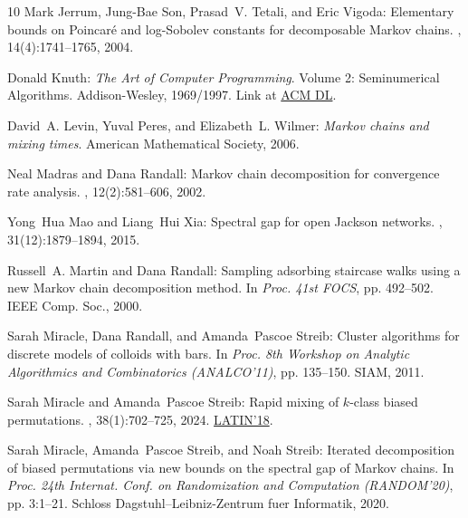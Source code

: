\documentclass[11pt]{article}
\begin{document}
\begin{thebibliography}{10}
{\sc Mark Jerrum, Jung-Bae Son, Prasad~V. Tetali, and Eric Vigoda}: Elementary
  bounds on {P}oincar\'e and log-{S}obolev constants for decomposable {M}arkov
  chains.
, 14(4):1741--1765, 2004.
\newblock [\epfmtdoi{10.1214/105051604000000639}]

{\sc Donald Knuth}: {\em The Art of Computer Programming}.
\newblock Volume 2: Seminumerical Algorithms.
\newblock Addison-Wesley, 1969/1997.
\newblock Link at \href{https://dl.acm.org/doi/10.5555/270146}{ACM DL}.

{\sc David~A. Levin, Yuval Peres, and Elizabeth~L. Wilmer}: {\em {M}arkov
  chains and mixing times}.
\newblock American Mathematical Society, 2006.

{\sc Neal Madras and Dana Randall}: Markov chain decomposition for convergence
  rate analysis.
, 12(2):581--606, 2002.

{\sc Yong~Hua Mao and Liang~Hui Xia}: Spectral gap for open {J}ackson networks.
, 31(12):1879--1894, 2015.
\newblock [\epfmtdoi{10.1007/S10114-015-4138-3}]

{\sc Russell~A. Martin and Dana Randall}: Sampling adsorbing staircase walks
  using a new {M}arkov chain decomposition method.
\newblock In {\em Proc. 41st FOCS}, pp. 492--502. IEEE Comp. Soc., 2000.

{\sc Sarah Miracle, Dana Randall, and Amanda~Pascoe Streib}: Cluster algorithms
  for discrete models of colloids with bars.
\newblock In {\em Proc. 8th Workshop on Analytic Algorithmics and Combinatorics
  (ANALCO'11)}, pp. 135--150. SIAM, 2011.
\newblock [\epfmtdoi{10.1137/1.9781611973013.15}]

{\sc Sarah Miracle and Amanda~Pascoe Streib}: Rapid mixing of $k$-class biased
  permutations.
, 38(1):702--725, 2024.
\newblock \prelim
  \href{https://doi.org/10.1007/978-3-319-77404-6\_59}{LATIN'18}.
\newblock [\epfmtdoi{10.1137/22M148063X}]

{\sc Sarah Miracle, Amanda~Pascoe Streib, and Noah Streib}: Iterated
  decomposition of biased permutations via new bounds on the spectral gap of
  {M}arkov chains.
\newblock In {\em Proc. 24th Internat. Conf. on Randomization and Computation
  (RANDOM'20)}, pp. 3:1--21. Schloss Dagstuhl--Leibniz-Zentrum fuer Informatik,
  2020.


\end{thebibliography}
\end{document}
